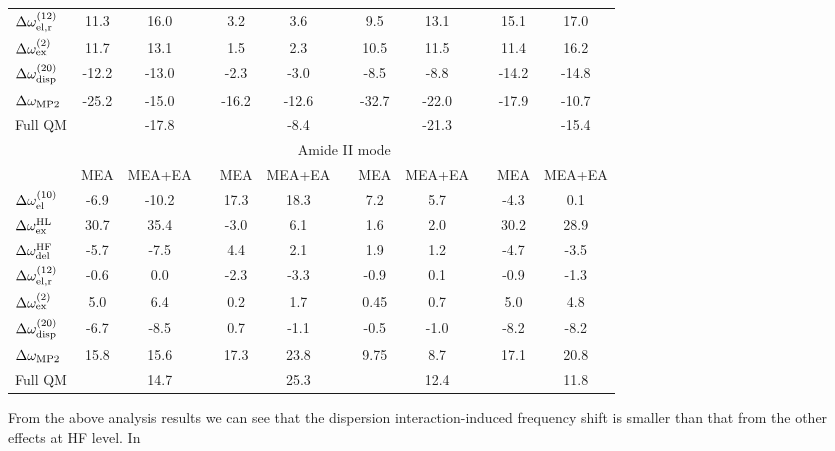 \documentclass[b5paper,oneside,fleqn,11pt]{book}
\begin{document}
\begin{refsection}
\begin{table}
\begin{tabular*}{1.0\textwidth}{@{\extracolsep{\fill} } l ccccccccccc }
 $\Delta \omega_{{\rm el,r}}^{(12)}$    &  11.3  &  16.0   &&   3.2  &   3.6   &&   9.5  &  13.1  &&  15.1 &  17.0 \\
 $\Delta \omega_{{\rm ex}}^{(2)}$       &  11.7  &  13.1   &&   1.5  &   2.3   &&  10.5  &  11.5  &&  11.4 &  16.2 \\
 $\Delta \omega_{{\rm disp}}^{(20)}$    & -12.2  & -13.0   &&  -2.3  &  -3.0   &&  -8.5  &  -8.8  && -14.2 & -14.8 \\
 $\Delta \omega_{\rm MP2}$              & -25.2  & -15.0   &&  -16.2 & -12.6   && -32.7  & -22.0  && -17.9 & -10.7 \\
 Full QM                                &        & -17.8   &&        &  -8.4   &&        & -21.3  &&       & -15.4 \\
\hline
 & \multicolumn{11}{c}{Amide II mode} \\
\cline{2-12}
 & MEA & MEA+EA &&  MEA & MEA+EA && MEA & MEA+EA && MEA & MEA+EA \\
\hline
 $\Delta \omega_{{\rm el}}^{(10)}$      &  -6.9  & -10.2   &&  17.3  &  18.3   &&   7.2  &   5.7  &&  -4.3 &   0.1 \\
 $\Delta \omega_{{\rm ex}}^{\rm HL}$    &  30.7  &  35.4   &&  -3.0  &   6.1   &&   1.6  &   2.0  &&  30.2 &  28.9 \\
 $\Delta \omega_{{\rm del}}^{\rm HF}$   &  -5.7  &  -7.5   &&   4.4  &   2.1   &&   1.9  &   1.2  &&  -4.7 &  -3.5 \\
 $\Delta \omega_{{\rm el,r}}^{(12)}$    &  -0.6  &   0.0   &&  -2.3  &  -3.3   &&  -0.9  &   0.1  &&  -0.9 &  -1.3 \\
 $\Delta \omega_{{\rm ex}}^{(2)}$       &   5.0  &   6.4   &&   0.2  &   1.7   &&   0.45 &   0.7  &&   5.0 &   4.8 \\
 $\Delta \omega_{{\rm disp}}^{(20)}$    &  -6.7  &  -8.5   &&   0.7  &  -1.1   &&  -0.5  &  -1.0  &&  -8.2 &  -8.2 \\
 $\Delta \omega_{\rm MP2}$              &  15.8  &  15.6   &&  17.3  &  23.8   &&   9.75 &   8.7  &&  17.1 &  20.8 \\
 Full QM                                &        &  14.7   &&        &  25.3   &&        &  12.4  &&       &  11.8 \\
\hline\hline
\end{tabular*}
\end{table}
%
From the above analysis results we can see that the dispersion
interaction\hyp{}induced frequency shift is smaller than that from
the other effects at HF level. In

\end{refsection}
\end{document}
